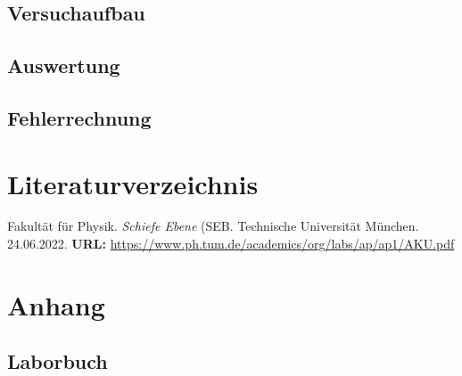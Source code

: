 \documentclass{article}
\begin{document}
\subsection{Versuchaufbau}
\subsection{Auswertung}
\subsection{Fehlerrechnung}
\section{Literaturverzeichnis}
\begin{thebibliography}{9}
Fakultät für Physik. \emph{Schiefe Ebene} (SEB. Technische Universität München. 24.06.2022.
\textbf{URL:} \url{https://www.ph.tum.de/academics/org/labs/ap/ap1/AKU.pdf}

\end{thebibliography}
\section{Anhang}
\subsection{Laborbuch}

\end{document}
